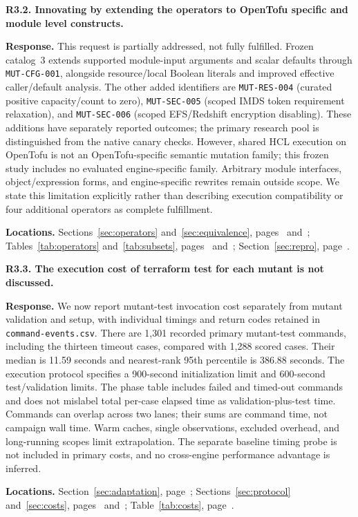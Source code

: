 \medskip
\noindent\textbf{R3.2. Innovating by extending the operators to OpenTofu specific and module level constructs.}\label{response:R3.2}\par
\textbf{Response.} This request is partially addressed, not fully fulfilled. Frozen catalog~3 extends supported module-input arguments and scalar defaults through \texttt{MUT-CFG-001}, alongside resource/local Boolean literals and improved effective caller/default analysis. The other added identifiers are \texttt{MUT-RES-004} (curated positive capacity/count to zero), \texttt{MUT-SEC-005} (scoped IMDS token requirement relaxation), and \texttt{MUT-SEC-006} (scoped EFS/Redshift encryption disabling). These additions have separately reported outcomes; the primary research pool is distinguished from the native canary checks. However, shared HCL execution on OpenTofu is not an OpenTofu-specific semantic mutation family; this frozen study includes no evaluated engine-specific family. Arbitrary module interfaces, object/expression forms, and engine-specific rewrites remain outside scope. We state this limitation explicitly rather than describing execution compatibility or four additional operators as complete fulfillment.\par
\textbf{Locations.} Sections~\ref{sec:operators} and~\ref{sec:equivalence}, pages~\pageref{sec:operators} and~\pageref{sec:equivalence}; Tables~\ref{tab:operators} and~\ref{tab:subsets}, pages~\pageref{tab:operators} and~\pageref{tab:subsets}; Section~\ref{sec:repro}, page~\pageref{sec:repro}.

\medskip
\noindent\textbf{R3.3. The execution cost of terraform test for each mutant is not discussed.}\label{response:R3.3}\par
\textbf{Response.} We now report mutant-test invocation cost separately from mutant validation and setup, with individual timings and return codes retained in \texttt{command-events.csv}. There are 1,301 recorded primary mutant-test commands, including the thirteen timeout cases, compared with 1,288 scored cases. Their median is 11.59 seconds and nearest-rank 95th percentile is 386.88 seconds. The execution protocol specifies a 900-second initialization limit and 600-second test/validation limits. The phase table includes failed and timed-out commands and does not mislabel total per-case elapsed time as validation-plus-test time. Commands can overlap across two lanes; their sums are command time, not campaign wall time. Warm caches, single observations, excluded overhead, and long-running scopes limit extrapolation. The separate baseline timing probe is not included in primary costs, and no cross-engine performance advantage is inferred.\par
\textbf{Locations.} Section~\ref{sec:adaptation}, page~\pageref{sec:adaptation}; Sections~\ref{sec:protocol} and~\ref{sec:costs}, pages~\pageref{sec:protocol} and~\pageref{sec:costs}; Table~\ref{tab:costs}, page~\pageref{tab:costs}.

